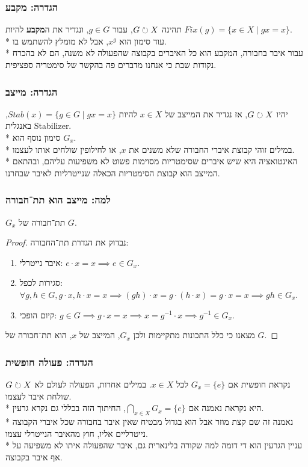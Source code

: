 \subsubsection{הגדרה: מקבע}
תהינה $G \circlearrowright X$, עבור $g \in G$, ונגדיר את ה\textbf{מקבע} להיות $ Fix(g) = \{ x \in X \mid gx = x \}$.\\*
עוד סימון הוא $x^g$, אבל לא מומלץ להשתמש בו. \\*
עבור איבר בחבורה, המקבע הוא כל האיברים בקבוצה שהפעולה לא משנה, הם לא בהכרח נקודות שבת כי אנחנו מדברים פה בהקשר של סימטריה ספציפית.

\subsubsection{הגדרה: מייצב}
יהיו $G \circlearrowright X$, אז נגדיר  את המייצב של $x \in X$ להיות $Stab(x) = \{ g \in G \mid g x = x \}$, באנגלית Stabilizer. \\*
סימון נוסף הוא $G_x$. \\*
במילים זוהי קבוצת איברי החבורה שלא משנים את $x$, או לחילופין שולחים אותו לעצמו. \\*
האינטואציה היא שיש איברים שסימטריות מסוימות פשוט לא משפיעות עליהם, ובהתאם המייצב הוא קבוצת הסימטריות הכאלה שנייטרליות לאיבר שבחרנו.

\subsubsection{למה: מייצב הוא תת־חבורה}
$G_x$ תת־חבורה של $G$.
\begin{proof}
	נבדוק את הגדרת תת־החבורה:
	\begin{enumerate}
		\item איבר נייטרלי: $e \cdot x = x \implies e \in G_x$.
		\item סגירות לכפל: $\forall g, h \in G, g \cdot x, h \cdot x = x \implies (gh) \cdot x = g \cdot (h \cdot x) = g \cdot x = x \implies gh \in G_x$.
		\item קיום הופכי: $g \in G \implies g \cdot x = x \implies x = g^{-1} \cdot x \implies g^{-1} \in G_x$.
	\end{enumerate}
	מצאנו כי כלל התכונות מתקיימות ולכן $G_x$, המייצב של $x$, הוא תת־חבורה של $G$.
\end{proof}

\subsubsection{הגדרה: פעולה חופשית}
$G \circlearrowright X$ נקראת חופשית אם $G_x = \{e\}$ לכל $x \in X$. במילים אחרות, הפעולה לעולם לא שולחת איבר לעצמו. \\*
היא נקראת נאמנה אם $\bigcap_{x \in X} G_x = \{e\}$, החיתוך הזה בכללי גם נקרא גרעין. \\*
נאמנה זה שם קצת מוזר אבל הוא בגדול מבטיח שאין איבר בחבורה שכל איברי הקבוצה נייטרליים אליו, חוץ מהאיבר הנייטרלי עצמו. \\*
עניין הגרעין הוא די דומה למה שקורה בלינארית גם, איבר שהפעולה איתו לא משפיעה על אף איבר בקבוצה.

